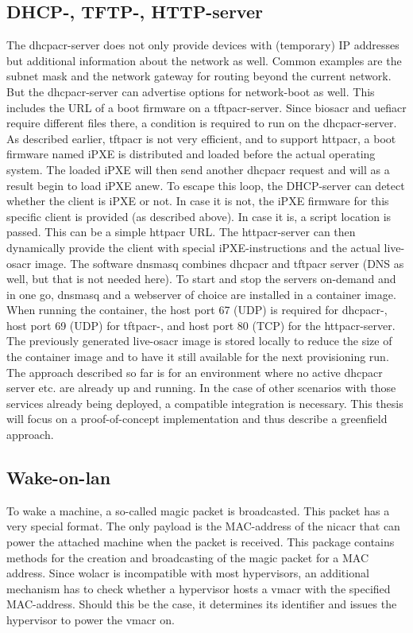 \subsection{DHCP-, TFTP-, HTTP-server}
The \gls{dhcpacr}-server does not only provide devices with (temporary) IP addresses but additional information about the network as well. Common examples are the subnet mask and the network gateway for routing beyond the current network. But the \gls{dhcpacr}-server can advertise options for network-boot as well. This includes the URL of a boot firmware on a \gls{tftpacr}-server. Since \gls{biosacr} and \gls{uefiacr} require different files there, a condition is required to run on the \gls{dhcpacr}-server. As described earlier, \gls{tftpacr} is not very efficient, and to support \gls{httpacr}, a boot firmware named iPXE is distributed and loaded before the actual operating system. The loaded iPXE will then send another \gls{dhcpacr} request and will as a result begin to load iPXE anew. To escape this loop, the DHCP-server can detect whether the client is iPXE or not. In case it is not, the iPXE firmware for this specific client is provided (as described above). In case it is, a script location is passed. This can be a simple \gls{httpacr} URL. The \gls{httpacr}-server can then dynamically provide the client with special iPXE-instructions and the actual live-\gls{osacr} image.
\newline
The software dnsmasq combines \gls{dhcpacr} and \gls{tftpacr} server (DNS as well, but that is not needed here). To start and stop the servers on-demand and in one go, dnsmasq and a webserver of choice are installed in a container image. When running the container, the host port 67 (UDP) is required for \gls{dhcpacr}-, host port 69 (UDP) for \gls{tftpacr}-, and host port 80 (TCP) for the \gls{httpacr}-server. The previously generated live-\gls{osacr} image is stored locally to reduce the size of the container image and to have it still available for the next provisioning run.
\newline
The approach described so far is for an environment where no active \gls{dhcpacr} server etc. are already up and running. In the case of other scenarios with those services already being deployed, a compatible integration is necessary. This thesis will focus on a proof-of-concept implementation and thus describe a greenfield approach.

\subsection{Wake-on-lan}
To wake a machine, a so-called magic packet is broadcasted. This packet has a very special format. The only  payload is the MAC-address of the \gls{nicacr} that can power the attached machine when the packet is received.
\newline
This package contains methods for the creation and broadcasting of the magic packet for a MAC address. Since \gls{wolacr} is incompatible with most hypervisors, an additional mechanism has to check whether a hypervisor hosts a \gls{vmacr} with the specified MAC-address. Should this be the case, it determines its identifier and issues the hypervisor to power the \gls{vmacr} on.

